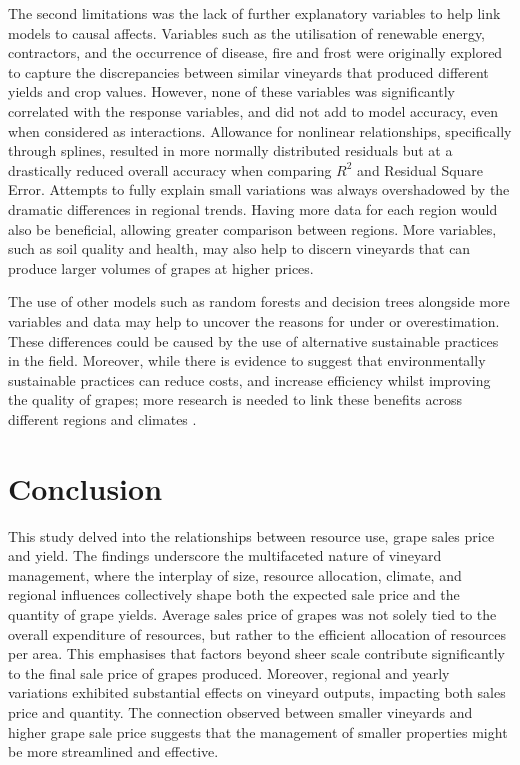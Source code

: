 \documentclass[review,12pt,authoryear]{elsarticle}
\begin{document}
\begin{linenumbers}
\par
The second limitations was the lack of further explanatory variables to help link models to causal affects. Variables such as the utilisation of renewable energy, contractors, and the occurrence of disease, fire and frost were originally explored to capture the discrepancies between similar vineyards that produced different yields and crop values. However, none of these variables was significantly correlated with the response variables, and did not add to model accuracy, even when considered as interactions. Allowance for nonlinear relationships, specifically through splines, resulted in more normally distributed residuals but at a drastically reduced overall accuracy when comparing $R^2$ and Residual Square Error. Attempts to fully explain small variations was always overshadowed by the dramatic differences in regional trends. Having more data for each region would also be beneficial, allowing greater comparison between regions. More variables, such as soil quality and health, may also help to discern vineyards that can produce larger volumes of grapes at higher prices.
\par
The use of other models such as random forests and decision trees alongside more variables and data may help to uncover the reasons for under or overestimation. These differences could be caused by the use of alternative sustainable practices in the field. Moreover, while there is evidence to suggest that environmentally sustainable practices can reduce costs, and increase efficiency whilst improving the quality of grapes; more research is needed to link these benefits across different regions and climates \citep{baianoOverviewSustainabilityWine2021,marianiSustainableWinegrowingCurrent2015,montalvo-falconSustainabilityResearchWine2023}.
\section{Conclusion}

This study delved into the relationships between resource use, grape sales price and yield. The findings underscore the multifaceted nature of vineyard management, where the interplay of size, resource allocation, climate, and regional influences collectively shape both the expected sale price and the quantity of grape yields. Average sales price of grapes was not solely tied to the overall expenditure of resources, but rather to the efficient allocation of resources per area. This emphasises that factors beyond sheer scale contribute significantly to the final sale price of grapes produced. Moreover, regional and yearly variations exhibited substantial effects on vineyard outputs, impacting both sales price and quantity. The connection observed between smaller vineyards and higher grape sale price suggests that the management of smaller properties might be more streamlined and effective.



\end{linenumbers}
\end{document}
